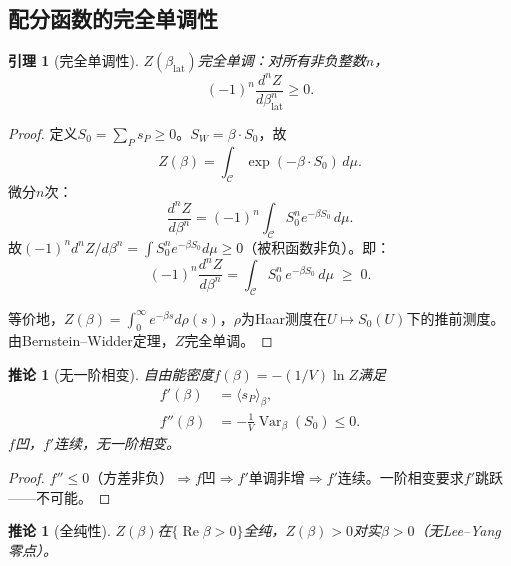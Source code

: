 \documentclass[12pt,a4paper]{article}
\theoremstyle{plain}
\newtheorem{lemma}[theorem]{引理}
\newtheorem{corollary}[theorem]{推论}
\theoremstyle{definition}
\theoremstyle{remark}
\begin{document}
\subsection{配分函数的完全单调性}\label{sec:cm}

\begin{lemma}[完全单调性]\label{lem:cm}
$Z(\beta_{\mathrm{lat}})$完全单调：对所有非负整数$n$，
\begin{equation}\label{eq:cm}
(-1)^n \frac{d^nZ}{d\beta_{\mathrm{lat}}^n} \geq 0.
\end{equation}
\end{lemma}

\begin{proof}
定义$S_0=\sum_P s_P\geq 0$。$S_W=\beta\cdot S_0$，故
\begin{equation}\label{eq:Zlaplace}
Z(\beta) = \int_{\mathcal{C}} \exp(-\beta\cdot S_0)\,d\mu.
\end{equation}
微分$n$次：
\begin{equation}\label{eq:cmderiv}
\frac{d^nZ}{d\beta^n} = (-1)^n\int_{\mathcal{C}} S_0^n e^{-\beta S_0}\,d\mu.
\end{equation}
故$(-1)^n d^nZ/d\beta^n = \int S_0^n e^{-\beta S_0}d\mu \geq 0$（被积函数非负）。即：
\begin{equation}
(-1)^n\frac{d^nZ}{d\beta^n} = \int_{\mathcal{C}} S_0^n\,e^{-\beta S_0}\,d\mu \;\geq\; 0.
\end{equation}

等价地，$Z(\beta)=\int_0^\infty e^{-\beta s}d\rho(s)$，$\rho$为Haar测度在$U\mapsto S_0(U)$下的推前测度。由Bernstein--Widder定理\cite{Bernstein1929,Widder1941}，$Z$完全单调。
\end{proof}

\begin{corollary}[无一阶相变]\label{cor:no1st}
自由能密度$f(\beta)=-(1/V)\ln Z$满足
\begin{align}
f'(\beta) &= \langle s_P\rangle_\beta, \label{eq:fprime}\\
f''(\beta) &= -\frac{1}{V}\operatorname{Var}_\beta(S_0) \leq 0. \label{eq:fdprime}
\end{align}
$f$凹，$f'$连续，无一阶相变。
\end{corollary}

\begin{proof}
$f''\leq 0$（方差非负）$\Rightarrow f$凹$\Rightarrow f'$单调非增$\Rightarrow f'$连续。一阶相变要求$f'$跳跃——不可能。
\end{proof}

\begin{corollary}[全纯性]\label{cor:holo}
$Z(\beta)$在$\{\operatorname{Re}\beta>0\}$全纯，$Z(\beta)>0$对实$\beta>0$（无Lee--Yang零点）。
\end{corollary}
\end{document}
